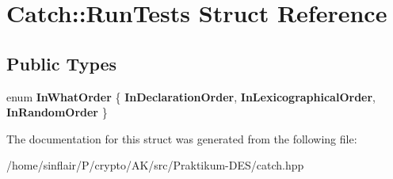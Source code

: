 \hypertarget{structCatch_1_1RunTests}{}\section{Catch\+:\+:Run\+Tests Struct Reference}
\label{structCatch_1_1RunTests}
\subsection*{Public Types}
\begin{DoxyCompactItemize}
\item 
\mbox{\label{structCatch_1_1RunTests_ab56bd851b1dd085869992d1a9d73dc5d}} 
enum {\bfseries In\+What\+Order} \{ {\bfseries In\+Declaration\+Order}, 
{\bfseries In\+Lexicographical\+Order}, 
{\bfseries In\+Random\+Order}
 \}
\end{DoxyCompactItemize}


The documentation for this struct was generated from the following file\+:\begin{DoxyCompactItemize}
\item 
/home/sinflair/\+P/crypto/\+A\+K/src/\+Praktikum-\/\+D\+E\+S/catch.\+hpp\end{DoxyCompactItemize}
